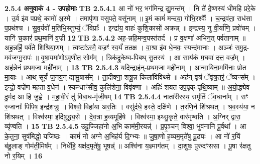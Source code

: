 \documentclass[17pt]{extarticle}
\begin{document}
                \textbf{ 2.5.4     अनुवाकं   4 -  उपहोमाः} \newline
                                \textbf{ TB 2.5.4.1} \newline
                  आ नो॑ भर॒ भग॑मिन्द्र द्यु॒मन्त᳚म् । नि ते॑ दे॒ष्णस्य॑ धीमहि प्ररे॒के । उ॒र्व इ॑व पप्रथे॒ कामो॑ अ॒स्मे । तमापृ॑णा वसुपते॒ वसू॑नाम् ॥ इ॒मं कामं॑ मन्दया॒ गोभि॒रश्वैः᳚ । च॒न्द्रव॑ता॒ राध॑सा प॒प्रथ॑श्च । सु॒व॒र्यवो॑ म॒तिभि॒स्तुभ्यं॒ ॅविप्राः᳚ । इन्द्रा॑य॒ वाहः॑ कुशि॒कासो॑ अक्रन्न् ॥ इन्द्र॑स्य॒ नु वी॒र्या॑णि॒ प्रवो॑चम् । यानि॑ च॒कार॑ प्रथ॒मानि॑ व॒ज्री \textbf{ 12} \newline
                  \newline
                                \textbf{ TB 2.5.4.2} \newline
                  अह॒-न्नहि॒मन्व॒पस्त॑तर्द । प्र व॒क्षणा॑ अभिन॒त् पर्व॑तानाम् ॥ अह॒न्नहिं॒ पर्व॑ते शिश्रिया॒णम् । त्वष्टा᳚ऽस्मै॒ वज्रꣳ॑ स्व॒र्यं॑ ततक्ष । वा॒श्रा इ॑व धे॒नवः॒ स्यन्द॑मानाः । अञ्जः॑ समु॒द्र-मव॑जग्मु॒रापः॑ ॥ वृ॒षा॒यमा॑णोऽवृणीत॒ सोम᳚म् । त्रिक॑द्रुकेष्व-पिबथ् सु॒तस्य॑ । आ साय॑कं म॒घवा॑ दत्त॒ वज्र᳚म् । अह॑न्नेनं प्रथम॒जा मही॑नाम् । \textbf{ 13} \newline
                  \newline
                                \textbf{ TB 2.5.4.3} \newline
                  यदिन्द्राह॑न्-प्रथम॒जा मही॑नाम् । आन्मा॒यिना॒ममि॑नाः॒ प्रोत मा॒याः । आथ् सूर्यं॑ ज॒नय॒न् द्यामु॒षास᳚म् । ता॒दीक्ना॒ शत्रू॒न्न किला॑विविथ्से ॥ अह॑न् वृ॒त्रं ॅवृ॑त्र॒तरं॒ ॅव्यꣳस᳚म् । इन्द्रो॒ वज्रे॑ण मह॒ता व॒धेन॑ । स्कन्धाꣳ॑सीव॒ कुलि॑शेना॒ विवृ॑क्णा । अहिः॑ शयत उप॒पृक्-पृ॑थि॒व्याम् ॥ अ॒यो॒द्ध्येव दु॒र्मद॒ आ हि जु॒ह्वे । म॒हा॒वी॒रं तु॑ विबा॒ध-मृ॑जी॒षम् \textbf{ 14} \newline
                  \newline
                                \textbf{ TB 2.5.4.4} \newline
                  नाता॑रीरस्य॒ समृ॑तिं ॅव॒धाना᳚म् । सꣳ रु॒जानाः᳚ पिपिष॒ इन्द्र॑शत्रुः ॥ विश्वो॒ विहा॑या अर॒तिः । वसु॑र्दधे॒ हस्ते॒ दक्षि॑णे । त॒रणि॒र्न शि॑श्रथत् । श्र॒व॒स्य॑या॒ न शि॑श्रथत् । विश्व॑स्मा॒ इदि॑षुद्ध्य॒से । दे॒व॒त्रा ह॒व्यमूहि॑षे । विश्व॑स्मा॒ इथ्सु॒कृते॒ वार॑मृण्वति । अ॒ग्निर् द्वारा॒ व्यृ॑ण्वति । \textbf{ 15} \newline
                  \newline
                                \textbf{ TB 2.5.4.5} \newline
                  उदु॒ज्जिहा॑नो अ॒भि काम॑मी॒रयन्न्॑ । प्र॒पृ॒ञ्चन् विश्वा॒ भुव॑नानि पू॒र्वथा᳚ । आ के॒तुना॒ सुष॑मिद्धो॒ यजि॑ष्ठः । कामं॑ नो अग्ने अ॒भिह॑र्य दि॒ग्भ्यः ॥ जु॒षा॒णो ह॒व्यम॒मृते॑षु दू॒ढ्यः॑ । आ नो॑ र॒यिं ब॑हु॒लाङ् गोम॑ती॒मिष᳚म् । निधे॑हि॒ यक्ष॑द॒मृते॑षु॒ भूषन्न्॑ ॥ अश्वि॑ना य॒ज्ञ्माग॑तम् । दा॒शुषः॒ पुरु॑दꣳससा । पू॒षा र॑क्षतु नो र॒यिम् । \textbf{ 16} \newline
\end{document}
